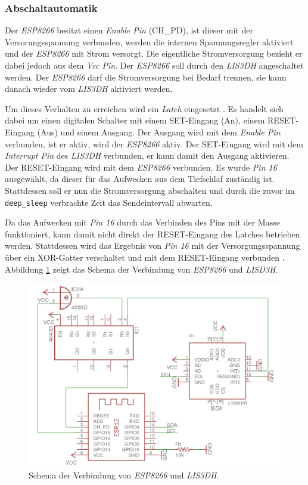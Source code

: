 \subsubsection{Abschaltautomatik}
\label{ch:Beschleunigungssensor:sec:Abschaltautomatik}
Der \emph{ESP8266} besitzt einen \emph{Enable Pin} (CH\_PD), ist dieser mit der Versorungsspannung verbunden, werden die internen Spannungsregler aktiviert und der \emph{ESP8266} mit Strom versorgt.
Die eigentliche Stromversorgung bezieht er dabei jedoch aus dem \emph{Vcc Pin}.
Der \emph{ESP8266} soll durch den \emph{LIS3DH} angeschaltet werden. 
Der \emph{ESP8266} darf die Stromversorgung bei Bedarf trennen, sie kann danach wieder vom \emph{LIS3DH} aktiviert werden. 

Um dieses Verhalten zu erreichen wird ein \emph{Latch} eingesetzt \cite{texas2003latch}.
Es handelt sich dabei um einen digitalen Schalter mit einem SET-Eingang (An), einem RESET-Eingang (Aus) und einem Ausgang.
Der Ausgang wird mit dem \emph{Enable Pin} verbunden, ist er aktiv, wird der \emph{ESP8266} aktiv.
Der SET-Eingang wird mit dem \emph{Interrupt Pin} des \emph{LIS3DH} verbunden, er kann damit den Ausgang aktivieren.
Der RESET-Eingang wird mit dem \emph{ESP8266} verbunden. 
Es wurde \emph{Pin 16} ausgewählt, da dieser für das Aufwecken aus dem Tiefschlaf zuständig ist. 
Stattdessen soll er nun die Stromversorgung abschalten und durch die zuvor im \texttt{deep\_sleep} verbrachte Zeit das Sendeintervall abwarten.

Da das Aufwecken mit \emph{Pin 16} durch das Verbinden des Pins mit der Masse funktioniert, kann damit nicht direkt der RESET-Eingang des Latches betrieben werden.
Stattdessen wird das Ergebnis von \emph{Pin 16} mit der Versorgungsspannung über ein XOR-Gatter verschaltet und mit dem RESET-Eingang verbunden \cite{texas2014xor}.
Abbildung \ref{fig:schematics} zeigt das Schema der Verbindung von \emph{ESP8266} und \emph{LISD3H}.

\begin{figure}[h]
  \centering
	\includegraphics[width=\textwidth]{images/schematics.png}
  \caption{Schema der Verbindung von \emph{ESP8266} und \emph{LIS3DH}.}
  \label{fig:schematics}
\end{figure}

